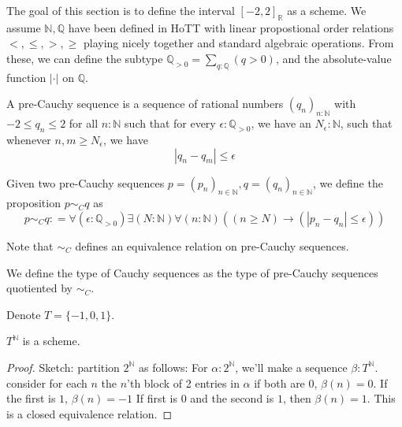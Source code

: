 The goal of this section is to define the interval $[-2,2]_\mathbb R$ as a scheme. 
We assume $\mathbb N, \mathbb Q$ have been defined in HoTT
with linear propostional order relations $<,\leq, > ,\geq$ playing nicely together 
and standard algebraic operations. 
From these, we can define the subtype $\mathbb Q_{>0}=\sum_{q : \mathbb Q} (q>0)$, 
and the absolute-value function $|\cdot|$ on $\mathbb Q$. 

\begin{definition}
  A pre-Cauchy sequence is a sequence of rational numbers $(q_n)_{n: \mathbb N}$ with $-2 \leq q_n \leq 2$ 
  for all $n:\mathbb N$
  such that for every $\epsilon: \mathbb Q_{>0}$, we have an $N_\epsilon:\mathbb N$, 
  such that whenever $n,m \geq N_\epsilon$, we have 
\begin{equation}
  | q_n - q_m | \leq \epsilon
\end{equation} 
\end{definition}

\begin{definition}
Given two pre-Cauchy sequences $p = (p_n)_{n\in\mathbb N}, q=(q_n)_{n\in\mathbb N}$, 
we define the proposition $p \sim_C  q$ as 
\begin{equation}
  p \sim_C q : = \forall (\epsilon : \mathbb Q_{>0} )\exists ( N :\mathbb N) \forall (n : \mathbb N) ((n \geq N) \to 
  (| p_n - q_n| \leq  \epsilon))
\end{equation}
\end{definition}
Note that $\sim_C$ defines an equivalence relation on pre-Cauchy sequences. 
\begin{definition}
We define the type of Cauchy sequences as the type of pre-Cauchy sequences quotiented by $\sim_C$. 
\end{definition}

%
%
Denote $T = \{-1,0,1\}$. 
\begin{lemma}
  $T^\mathbb N$ is a scheme. 
\end{lemma}
\begin{proof}
  Sketch: partition $2^\mathbb N$ as follows: 
  For $\alpha: 2^\mathbb N$, we'll make a sequence $\beta: T^\mathbb N$.
  consider for each $n$ the $n$'th block of 2 entries in $\alpha$
  if both are $0$, $\beta(n) = 0$. 
  If the first is $1$, $\beta(n) = -1$
  If first is $0$ and the second is $1$, then $\beta(n) = 1$. 
  This is a closed equivalence relation. 
\end{proof} 

